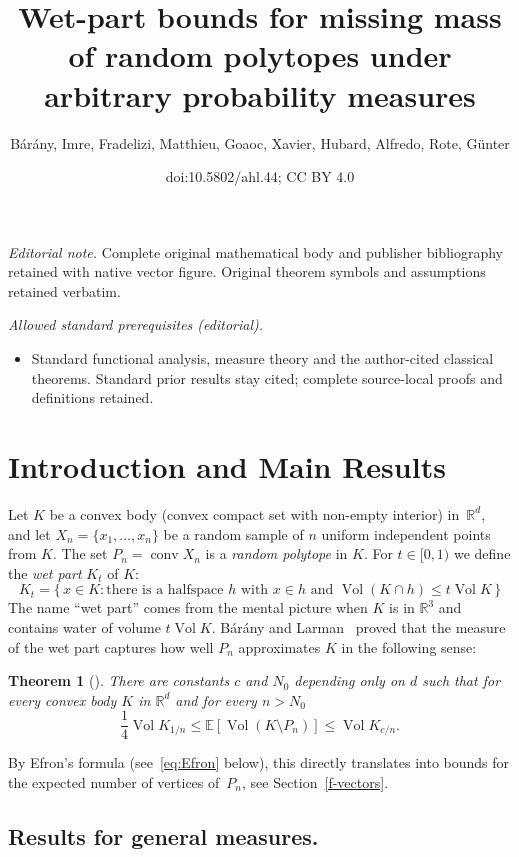 \documentclass[10pt]{amsart}
\title{Wet-part bounds for missing mass of random polytopes under arbitrary probability measures}
\author{Bárány, Imre, Fradelizi, Matthieu, Goaoc, Xavier, Hubard, Alfredo, Rote, Günter}
\date{doi:10.5802/ahl.44; CC BY 4.0}
\newtheorem{theo}{Theorem}[section]
\theoremstyle{definition}\newtheorem{defi}[theo]{Definition}\newtheorem{rema}[theo]{Remark}\newtheorem{exam}[theo]{Example}\newtheorem{exem}[theo]{Example}\newtheorem{nota}[theo]{Notation}
\DeclareMathOperator{\vol}{Vol}
\DeclareMathOperator{\conv}{conv}
\newcommand{\Rbb}{\mathbb{R}}%
\newcommand{\Ebb}{\mathbb{E}}%
\begin{document}
\maketitle
\noindent\textit{Editorial note.} Complete original mathematical body and publisher bibliography retained with native vector figure. Original theorem symbols and assumptions retained verbatim.\par\medskip
\noindent\textit{Allowed standard prerequisites (editorial).}\begin{itemize}
\item Standard functional analysis, measure theory and the author-cited classical theorems. Standard prior results stay cited; complete source-local proofs and definitions retained.
\end{itemize}\medskip


\section{Introduction and Main Results}

Let $K$ be a convex body (convex compact set with non-empty interior) in~$\Rbb^d$, and let $X_n=\{x_1,\ldots,x_n\}$ be a random sample of $n$ uniform independent points from $K$. The set $P_n=\conv X_n$ is a \emph{random polytope} in $K$. For $t\in [0,1)$ we define the \emph{wet part} $K_t$ of $K$:
\[
K_t=\{\,x \in K: \text{there is a halfspace }h \text{ with } x \in h \text{ and }\vol(K\cap h) \le t\vol K\,\}
\]
The name ``wet part'' comes from the mental picture when $K$ is in $\Rbb^3$ and contains water of volume $t\vol K$. Bárány and Larman~\cite{BarLar} proved that the measure of the wet part captures how well $P_n$ approximates $K$ in the following sense:

\begin{theo}[{\cite[Theorem~1]{BarLar}}] \label{th:BL}
There are constants $c$ and $N_0$ depending only on $d$ such that for every convex body $K$ in $\Rbb^d$ and for every $n>N_0$
\[
\frac 14 \vol K_{1/n} \le \Ebb[\vol(K\setminus P_n)] \le \vol K_{c/n}.
\]
\end{theo}

By Efron's formula (see~\eqref{eq:Efron} below), this directly translates into bounds for the expected number of vertices of~$P_n$, see Section~\ref{f-vectors}.

\subsection{Results for general measures.}
\end{document}

